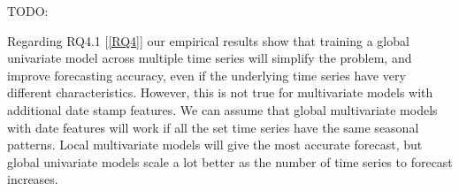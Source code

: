 TODO:
%


Regarding RQ4.1 [\ref{RQ4}] our empirical results show that training a global univariate model
across multiple time series will simplify the problem, and improve forecasting accuracy, even if the underlying time series
have very different characteristics.
However, this is not true for multivariate models with additional date stamp features.
We can assume that global multivariate models with date features will work if
all the set time series have the same seasonal patterns.
Local multivariate models will give the most accurate forecast, but global univariate
models scale a lot better as the number of time series to forecast increases.



